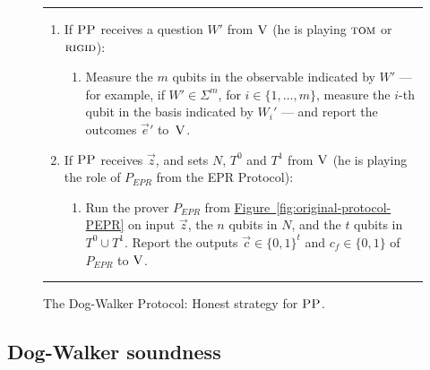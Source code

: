 \documentclass[11pt]{article}
\numberwithin{equation}{section}
\theoremstyle{definition}
\theoremstyle{plain}
\newcommand{\expref}[2]{\hyperref[#2]{#1~\ref{#2}}}
\newcommand{\rigid}{\textsc{rigid}}
\newcommand{\tom}{\textsc{tom}}
\newcommand{\ver}{\textsc{V}}
\newcommand{\pp}{\textsc{PP}}
\begin{document}
\begin{figure}[H]
\rule[1ex]{\textwidth}{0.5pt}
\vspace{-20pt}
\begin{enumerate}
  \item If $\pp$ receives a question ${W}'$ from $\ver$ (he is playing $\tom$ or $\rigid$):
\begin{enumerate}
     \item[]  Measure the $m$ qubits in the observable indicated by $W'$ --- for example, if $W'\in\Sigma^m$, for $i\in \{1,\ldots,m\}$, measure the $i$-th qubit in the basis indicated by $W_i'$ --- and report
       the outcomes $\vec{e}'$ to~$\ver$.
\end{enumerate}
\item If $\pp$ receives $\vec{z}$, and sets $N$, $T^0$ and $T^1$ from $\ver$ (he is playing the role of $P_{EPR}$ from the EPR Protocol):
\begin{enumerate}
     \item[] Run the prover $P_{EPR}$ from \expref{Figure}{fig:original-protocol-PEPR} on input $\vec{z}$, the $n$ qubits in $N$, and the $t$ qubits in $T^0\cup T^1$.
     Report the outputs $\vec{c}\in\{0,1\}^t$ and $c_f\in\{0,1\}$ of $P_{EPR}$  to $\ver$. 
\end{enumerate}
\end{enumerate}
\rule[2ex]{\textwidth}{0.5pt}\vspace{-.5cm}
\caption{The Dog-Walker Protocol: Honest strategy for $\pp$.}\label{fig:dogwalker-protocol-PP}
\end{figure}




\subsection{Dog-Walker soundness}  %
%
\end{document}
